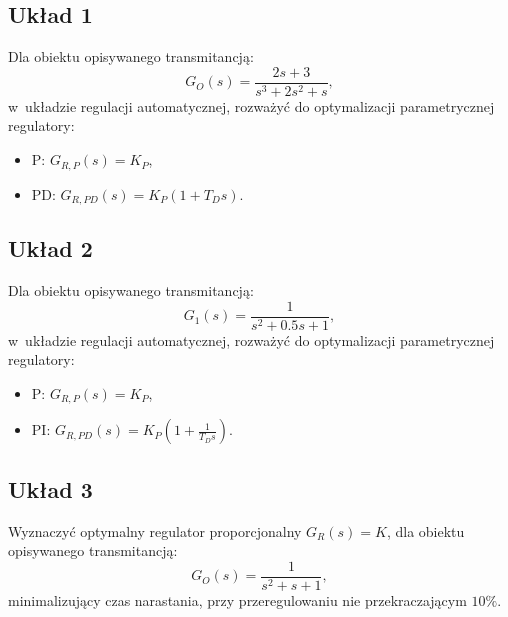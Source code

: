 \documentclass{sprawozdanie-agh}
\begin{document}
    \subsection{Układ 1}
    Dla obiektu opisywanego transmitancją:
    \begin{equation}
        \label{eq:system_1}
        G_{O}(s) = \frac{2s+3}{s^3+2s^2+s},
    \end{equation}
    w~układzie regulacji automatycznej, rozważyć do optymalizacji parametrycznej regulatory:
    \begin{itemize}
        \item P: $G_{R,P}(s) = K_{P}$,
        \item PD: $G_{R,PD}(s) = K_{P}(1 + T_{D}s)$.
    \end{itemize}

    \subsection{Układ 2}
    Dla obiektu opisywanego transmitancją:
    \begin{equation}
        \label{eq:system_2}
        G_{1}(s) = \frac{1}{s^2+0.5s+1},
    \end{equation}
    w~układzie regulacji automatycznej, rozważyć do optymalizacji parametrycznej regulatory:
    \begin{itemize}
        \item P: $G_{R,P}(s) = K_{P}$,
        \item PI: $G_{R,PD}(s) = K_{P}(1 + \frac{1}{T_{D}s})$.
    \end{itemize}

    \subsection{Układ 3}
    Wyznaczyć optymalny regulator proporcjonalny $G_{R}(s) = K$, dla obiektu opisywanego transmitancją:
    $$
        G_{O}(s) = \frac{1}{s^2 + s + 1},
    $$
    minimalizujący czas narastania, przy przeregulowaniu nie przekraczającym $10\%$.
\end{document}
